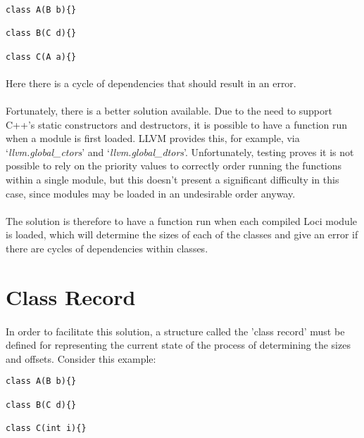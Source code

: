 \documentclass{article}
\begin{document}
\begin{verbatim}
class A(B b){}

class B(C d){}

class C(A a){}
\end{verbatim}

\paragraph{}
Here there is a cycle of dependencies that should result in an error.

\paragraph{}
Fortunately, there is a better solution available. Due to the need to support C++'s static constructors and destructors, it is possible to have a function run when a module is first loaded. LLVM provides this, for example, via `\emph{llvm.global\_ctors}' and `\emph{llvm.global\_dtors}'. Unfortunately, testing proves it is not possible to rely on the priority values to correctly order running the functions within a single module, but this doesn't present a significant difficulty in this case, since modules may be loaded in an undesirable order anyway.

\paragraph{}
The solution is therefore to have a function run when each compiled Loci module is loaded, which will determine the sizes of each of the classes and give an error if there are cycles of dependencies within classes.

\section{Class Record}

\paragraph{}
In order to facilitate this solution, a structure called the 'class record' must be defined for representing the current state of the process of determining the sizes and offsets. Consider this example:

\begin{verbatim}
class A(B b){}

class B(C d){}

class C(int i){}
\end{verbatim}
\end{document}
